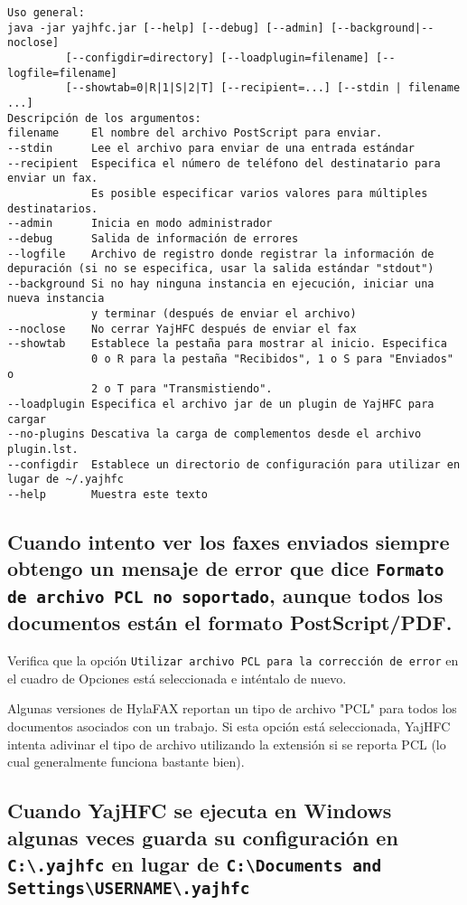 \documentclass[a4paper,10pt]{scrartcl}
\begin{document}
\begin{verbatim}
Uso general:
java -jar yajhfc.jar [--help] [--debug] [--admin] [--background|--noclose]
         [--configdir=directory] [--loadplugin=filename] [--logfile=filename]
         [--showtab=0|R|1|S|2|T] [--recipient=...] [--stdin | filename ...]
Descripción de los argumentos:
filename     El nombre del archivo PostScript para enviar.
--stdin      Lee el archivo para enviar de una entrada estándar
--recipient  Especifica el número de teléfono del destinatario para enviar un fax.
             Es posible especificar varios valores para múltiples destinatarios.
--admin      Inicia en modo administrador
--debug      Salida de información de errores
--logfile    Archivo de registro donde registrar la información de depuración (si no se especifica, usar la salida estándar "stdout")
--background Si no hay ninguna instancia en ejecución, iniciar una nueva instancia
             y terminar (después de enviar el archivo)
--noclose    No cerrar YajHFC después de enviar el fax
--showtab    Establece la pestaña para mostrar al inicio. Especifica 
             0 o R para la pestaña "Recibidos", 1 o S para "Enviados" o
             2 o T para "Transmistiendo".
--loadplugin Especifica el archivo jar de un plugin de YajHFC para cargar
--no-plugins Descativa la carga de complementos desde el archivo plugin.lst.
--configdir  Establece un directorio de configuración para utilizar en lugar de ~/.yajhfc
--help       Muestra este texto
\end{verbatim}


\subsection{Cuando intento ver los faxes enviados siempre obtengo un mensaje de error 
   que dice \texttt{Formato de archivo PCL no soportado}, aunque todos los documentos 
   están el formato PostScript/PDF.}

Verifica que la opción \texttt{Utilizar archivo PCL para la corrección de error} en el 
cuadro de Opciones está seleccionada e inténtalo de nuevo.
 
Algunas versiones de HylaFAX reportan 
un tipo de archivo "PCL" para todos los documentos asociados con un trabajo. 
Si esta opción está seleccionada, YajHFC intenta adivinar el tipo de archivo 
utilizando la extensión si se reporta PCL (lo cual generalmente funciona bastante bien).

\subsection{Cuando YajHFC se ejecuta en Windows algunas veces guarda su configuración en \texttt{C:\textbackslash .yajhfc} en lugar de \texttt{C:\textbackslash Documents and Settings\textbackslash USERNAME\textbackslash .yajhfc}}
\end{document}
